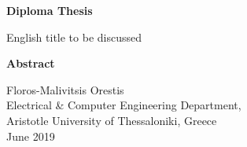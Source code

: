\begin{english}
{}

\begin{center}
    \centering
    \textbf{\Large{Diploma Thesis}}

    \vspace{0.5cm}
    \large{English title to be discussed}

    \vspace{1cm}
    \centering
    \textbf{Abstract}
\end{center}


\begin{flushright}
    \vspace{2cm}
    Floros-Malivitsis Orestis\\
    Electrical \& Computer Engineering Department,\\
    Aristotle University of Thessaloniki, Greece\\
    June 2019
\end{flushright}
\end{english}

